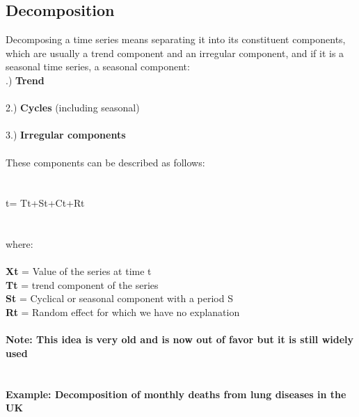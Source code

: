 \documentclass[10pt, a4paper]{article} %
\begin{document}
\pagebreak

\subsection{Decomposition}%
Decomposing a time series means separating it into its constituent components, which are usually a trend component and an irregular component, and if it is a seasonal time series, a seasonal component:\\

.) \textbf{Trend}\\
\\
2.) \textbf{Cycles} (including seasonal)\\
\\
3.) \textbf{Irregular components}\\
\\
These components can be described as follows:\\
\\
\\
t{\Large = T}t{\Large +S}t{\Large +C}t{\Large +R}t\\
\\
\\
\noindent where:\\
\\
\textbf{Xt} = Value of the series at time t\\
\textbf{Tt} = trend component of the series\\
\textbf{St} = Cyclical or seasonal component with a period S\\
\textbf{Rt} = Random effect for which we have no explanation\\
\\
\textbf{Note: This idea is very old and is now out of favor but it is still widely used}
\\
\\
\\
\textbf{Example: Decomposition of monthly deaths from lung diseases in the UK}
\\
\end{document}

